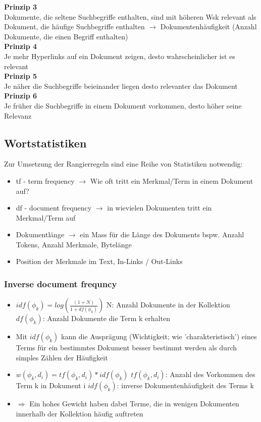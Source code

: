 \documentclass{report}
\theoremstyle{definition}
\theoremstyle{example}
\begin{document}
\textbf{Prinzip 3}\\
Dokumente, die seltene Suchbegriffe enthalten, sind mit höheren Wsk relevant als Dokument, die häufige Suchbegriffe enthalten $\rightarrow$ Dokumentenhäufigkeit (Anzahl Dokumente, die einen Begriff enthalten)\\

\textbf{Prinzip 4}\\
Je mehr Hyperlinks auf ein Dokument zeigen, desto wahrscheinlicher ist es relevant\\

\textbf{Prinzip 5}\\
Je näher die Suchbegriffe beieinander liegen desto relevanter das Dokument\\

\textbf{Prinzip 6}\\
Je früher die Suchbegriffe in einem Dokument vorkommen, desto höher seine Relevanz\\

\subsection{Wortstatistiken}
Zur Umsetzung der Rangierregeln sind eine Reihe von Statistiken notwendig:
\begin{itemize}
   \item tf - term frequency $\rightarrow$ Wie oft tritt ein Merkmal/Term in einem Dokument auf?
   \item df - document frequency $\rightarrow$ in wievielen Dokumenten tritt ein Merkmal/Term auf
   \item Dokumentlänge $\rightarrow$ ein Mass für die Länge des Dokuments bspw. Anzahl Tokens, Anzahl Merkmale, Bytelänge
   \item Position der Merkmale im Text, In-Links / Out-Links
\end{itemize}

\subsubsection{Inverse document frequncy}
\begin{itemize}
   \item $idf(\phi_k) = log(\frac{(1+N)}{1+df(\phi_k)})$
   \subitem N: Anzahl Dokumente in der Kollektion
   \subitem $df(\phi_k)$: Anzahl Dokumente die Term k erhalten
   \item Mit $idf(\phi_k)$ kann die Ausprägung (Wichtigkeit; wie 'charakteristisch') eines Terms für ein bestimmtes Dokument besser bestimmt werden als durch simples Zählen der Häufigkeit
   \item $w(\phi_k, d_i) = tf(\phi_k, d_i) * idf(\phi_k)$
   \subitem $tf(\phi_k,d_i)$: Anzahl des Vorkommen des Term k in Dokument i
   \subitem $idf(\phi_k)$: inverse Dokumentenhäufigkeit des Terms k
   \item $\Rightarrow$ Ein hohes Gewicht haben dabei Terme, die in wenigen Dokumenten innerhalb der Kollektion häufig auftreten
\end{itemize}
\end{document}

